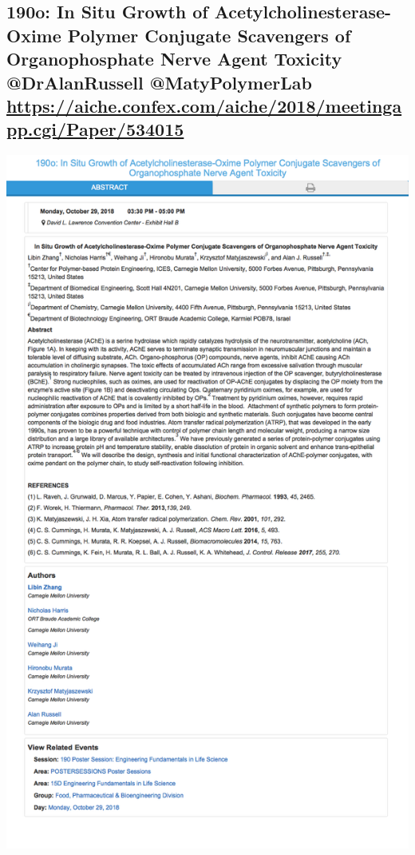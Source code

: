 \documentclass[11pt]{article}
\begin{document}
\subsection{190o: In Situ Growth of Acetylcholinesterase-Oxime Polymer Conjugate Scavengers of Organophosphate Nerve Agent Toxicity @DrAlanRussell @MatyPolymerLab \url{https://aiche.confex.com/aiche/2018/meetingapp.cgi/Paper/534015}}
\label{sec:org7cd4e62}
\begin{center}
\includegraphics[width=.9\linewidth]{./534015.png}
\end{center}
\end{document}
